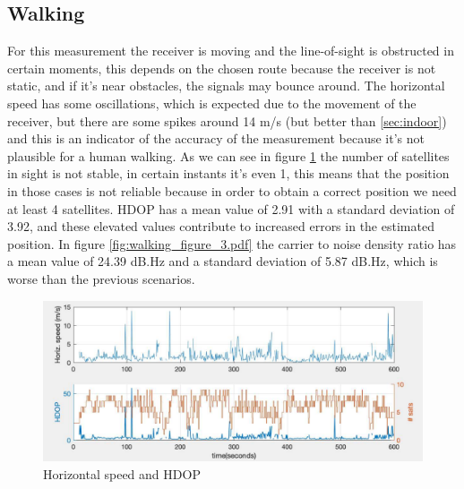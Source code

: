 \subsection{Walking}
\label{sec:walking}
For this measurement the receiver is moving and the line-of-sight is obstructed in certain moments, this depends on the chosen route because the receiver is not static, and if it's near obstacles, the signals may bounce around. The horizontal speed has some oscillations, which is expected due to the movement of the receiver, but there are some spikes around 14 m/s (but better than \ref{sec:indoor}) and this is an indicator of the accuracy of the measurement because it's not plausible for a human walking. As we can see in figure \ref{fig:figure4_walking} the number of satellites in sight is not stable, in certain instants it's even 1, this means that the position in those cases is not reliable because in order to obtain a correct position we need at least 4 satellites. HDOP has a mean value of 2.91 with a standard deviation of 3.92, and these elevated values contribute to increased errors in the estimated position. In figure \ref{fig:walking_figure_3.pdf} the carrier to noise density ratio has a mean value of 24.39 dB.Hz and a standard deviation of 5.87 dB.Hz, which is worse than the previous scenarios.
\begin{figure}[H]
\includegraphics[scale=0.22]{images/walking_figure_4.pdf}
\caption{Horizontal speed and HDOP}
\label{fig:figure4_walking}
\end{figure}
